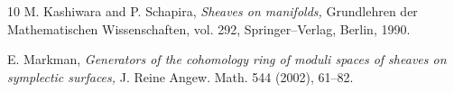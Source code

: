 \documentclass[11pt]{amsart}
\theoremstyle{plain}
\theoremstyle{definition}
\theoremstyle{remark}
\begin{document}
\begin{thebibliography}{10}
 M. Kashiwara and P. Schapira, {\em Sheaves on manifolds,} Grundlehren der Mathematischen Wissenschaften, vol.
292, Springer--Verlag, Berlin, 1990.
















 E. Markman, {\em Generators of the cohomology ring of moduli spaces of sheaves on symplectic surfaces,} J. Reine Angew. Math. 544 (2002), 61--82. 



\end{thebibliography}
\end{document}
